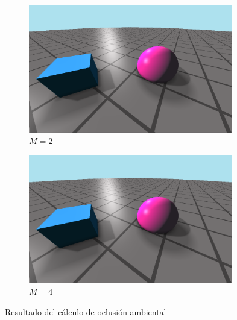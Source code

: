 \begin{figure}[!h]
     \begin{subfigure}[b]{0.49\linewidth}
        \centering
        \includegraphics[width=0.98\textwidth]{Plantilla-TFG-master/img/ao2.png}
        \caption{$M=2$}
     \end{subfigure}
     \begin{subfigure}[b]{0.49\linewidth}
        \centering
        \includegraphics[width=0.98\textwidth]{Plantilla-TFG-master/img/ao4.png}
        \caption{$M=4$}
     \end{subfigure}
     \caption{Resultado del cálculo de oclusión ambiental}
     \label{fig:resAO}
\end{figure}